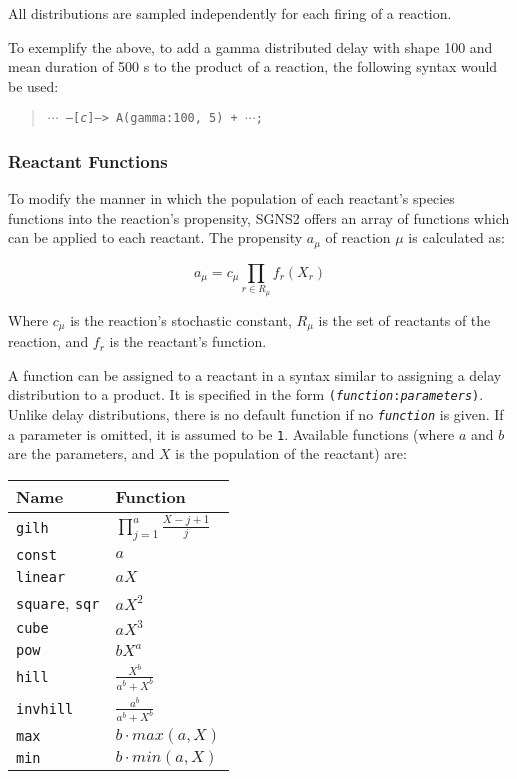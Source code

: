 \documentclass[10pt]{article}
\newcommand{\code}[1]{{\tt {#1}}}
\newcommand{\codeparam}[1]{\textrm{\textit{#1}}}
\newcommand{\programname}{SGNS2}
\begin{document}
All distributions are sampled independently for each firing of a reaction.

To exemplify the above, to add a gamma distributed delay with shape 100 and mean duration of 500 s to the product of a reaction, the following syntax would be used:

\begin{quote}
\code{$\cdots$ --[\codeparam{c}]--> A(gamma:100, 5) + $\cdots$;}
\end{quote}

\subsubsection{Reactant Functions}
\label{sec:reactfunc}

To modify the manner in which the population of each reactant's species functions into the reaction's propensity, {\programname} offers an array of functions which can be applied to each reactant. The propensity $a_\mu$ of reaction $\mu$ is calculated as:

\begin{equation}
a_\mu = c_\mu\mathop{\prod}_{r\in R_\mu}f_r(X_r)
\end{equation}

Where $c_\mu$ is the reaction's stochastic constant, $R_\mu$ is the set of reactants of the reaction, and $f_r$ is the reactant's function.

A function can be assigned to a reactant in a syntax similar to assigning a delay distribution to a product. It is specified in the form \code{(\codeparam{function}:\codeparam{parameters})}. Unlike delay distributions, there is no default function if no \code{\codeparam{function}} is given. If a parameter is omitted, it is assumed to be \code{1}. Available functions (where $a$ and $b$ are the parameters, and $X$ is the population of the reactant) are:

\begin{center}
\begin{tabular}{l|l}
Name & Function\\
\hline
\hline \code{gilh} & $\mathop{\prod}_{j=1}^{a} \frac{X-j+1}{j}$ \\
\hline \code{const} & $a$ \\
\hline \code{linear} & $aX$ \\
\hline \code{square}, \code{sqr} & $aX^2$ \\
\hline \code{cube} & $aX^3$ \\
\hline \code{pow} & $bX^a$ \\
\hline \code{hill} & $\frac{X^b}{a^b + X^b}$ \\
\hline \code{invhill} & $\frac{a^b}{a^b + X^b}$ \\
\hline \code{max} & $b\cdot max(a, X)$ \\
\hline \code{min} & $b\cdot min(a, X)$
\end{tabular}
\end{center}
\end{document}
